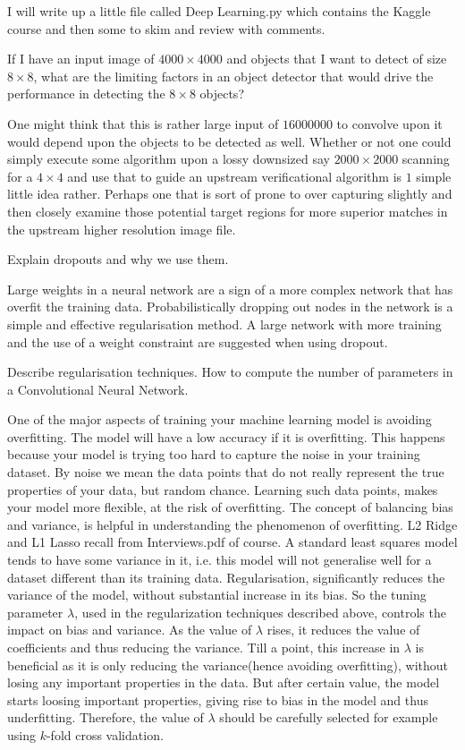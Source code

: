 I will write up a little file called Deep Learning.py which contains the Kaggle course and then some to skim and review with comments.

If I have an input image of $4000 \times 4000$ and objects that I want to detect of size $8 \times 8$, what are the limiting factors in an object detector that would drive the performance in detecting the $8 \times 8$ objects?

One might think that this is rather large input of $16000000$ to convolve upon it would depend upon the objects to be detected as well. Whether or not one could simply execute some algorithm upon a lossy downsized say $2000 \times 2000$ scanning for a $4 \times 4$ and use that to guide an upstream verificational algorithm is $1$ simple little idea rather. Perhaps one that is sort of prone to over capturing slightly and then closely examine those potential target regions for more superior matches in the upstream higher resolution image file.

Explain dropouts and why we use them.

Large weights in a neural network are a sign of a more complex network that has overfit the training data. Probabilistically dropping out nodes in the network is a simple and effective regularisation method. A large network with more training and the use of a weight constraint are suggested when using dropout.

Describe regularisation techniques. How to compute the number of parameters in a Convolutional Neural Network.

One of the major aspects of training your machine learning model is avoiding overfitting. The model will have a low accuracy if it is overfitting. This happens because your model is trying too hard to capture the noise in your training dataset. By noise we mean the data points that do not really represent the true properties of your data, but random chance. Learning such data points, makes your model more flexible, at the risk of overfitting.
The concept of balancing bias and variance, is helpful in understanding the phenomenon of overfitting. L2 Ridge and L1 Lasso recall from Interviews.pdf of course. A standard least squares model tends to have some variance in it, i.e. this model will not generalise well for a dataset different than its training data. Regularisation, significantly reduces the variance of the model, without substantial increase in its bias. So the tuning parameter $\lambda$, used in the regularization techniques described above, controls the impact on bias and variance. As the value of $\lambda$ rises, it reduces the value of coefficients and thus reducing the variance. Till a point, this increase in $\lambda$ is beneficial as it is only reducing the variance(hence avoiding overfitting), without losing any important properties in the data. But after certain value, the model starts loosing important properties, giving rise to bias in the model and thus underfitting. Therefore, the value of $\lambda$ should be carefully selected for example using $k$-fold cross validation.

